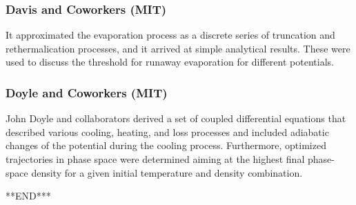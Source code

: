 \documentclass[12]{article}
\begin{document}
  \subsubsection{Davis and Coworkers (MIT)}
  It approximated the evaporation process as a discrete series of truncation and rethermalication processes, and it arrived at simple analytical results. These were used to discuss the threshold for runaway evaporation for different potentials.     
\subsubsection{Doyle and Coworkers (MIT)}
John Doyle and collaborators derived a set of coupled differential equations that described various cooling, heating, and loss processes and included adiabatic changes of the potential during the cooling process. Furthermore, optimized trajectories in phase space were determined aiming at the highest final phase-space density for a given initial temperature and density combination.
       
       
       
       
       
       
       
       
       
       
       
       
       
       
       
       
       
       
       
       
       
       



\begin{center}%
	\Large***END***
\end{center}
\end{document}
